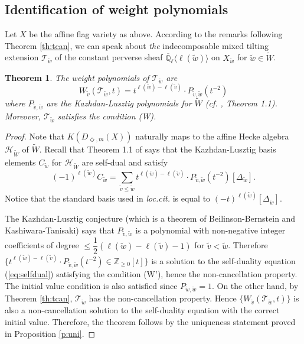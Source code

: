 \documentclass{amsart}
\theoremstyle{plain}
\newtheorem{theorem}[subsubsection]{Theorem}
\theoremstyle{definition}
\theoremstyle{remark}
\numberwithin{equation}{subsection}
\begin{document}
\subsection{Identification of weight polynomials}
Let $X$ be the affine flag variety as above. According to the remarks following Theorem \ref{th:tcan}, we can speak about {\em the} indecomposable mixed tilting extension ${\mathcal{T}}_{\widetilde{w}}$ of the constant perverse sheaf ${\overline{\mathbb{Q}}_{\ell}}{\langle{{\ell({\widetilde{w}})}}\rangle}$ on $X_{\widetilde{w}}$ for ${\widetilde{w}}\in{\widetilde{W}}$.  
\begin{theorem}\label{th:KL}
The weight polynomials of ${\mathcal{T}}_{\widetilde{w}}$ are
\begin{equation}\label{eq:tiltKL}
W_{\widetilde{v}}({\mathcal{T}}_{\widetilde{w}},t)=t^{\ell({\widetilde{w}})-\ell({\widetilde{v}})}\cdot P_{{\widetilde{v}},{\widetilde{w}}}(t^{-2})
\end{equation}
where $P_{{\widetilde{v}},{\widetilde{w}}}$ are the Kazhdan-Lusztig polynomials for ${\widetilde{W}}$ (cf. \cite{KL}, Theorem 1.1). Moreover, ${\mathcal{T}}_{\widetilde{w}}$ satisfies the condition \textup{(W)}.
\end{theorem}
\begin{proof}
Note that $K({D_{\Diamond,m}({X})})$ naturally maps to the affine Hecke algebra ${\mathcal{H}}_{\widetilde{W}}$ of ${\widetilde{W}}$. Recall that Theorem 1.1 of \cite{KL} says that the Kazhdan-Lusztig basis elements $C_{\widetilde{w}}$ for ${\mathcal{H}}_{\widetilde{W}}$ are self-dual and satisfy
\begin{equation*}
(-1)^{\ell({\widetilde{w}})}C_{\widetilde{w}}=\sum_{{\widetilde{v}}\leq{\widetilde{w}}}t^{\ell({\widetilde{w}})-\ell({\widetilde{v}})}\cdot P_{{\widetilde{v}},{\widetilde{w}}}(t^{-2})[\Delta_{\widetilde{w}}].
\end{equation*}
Notice that the standard basis used in \textit{loc.cit.} is equal to $(-t)^{\ell({\widetilde{w}})}[\Delta_{\widetilde{w}}]$.

The Kazhdan-Lusztig conjecture (which is a theorem of Beilinson-Bernstein and Kashiwara-Tanisaki) says that $P_{{\widetilde{v}},{\widetilde{w}}}$ is a polynomial with non-negative integer coefficients of degree $\leq\dfrac{1}{2}(\ell({\widetilde{w}})-\ell({\widetilde{v}})-1)$ for ${\widetilde{v}}<{\widetilde{w}}$. Therefore $\{t^{\ell({\widetilde{w}})-\ell({\widetilde{v}})}\cdot P_{{\widetilde{v}},{\widetilde{w}}}(t^{-2})\in{\mathbb{Z}}_{\geq0}[t]\}$ is a solution to the self-duality equation (\ref{eq:selfdual}) satisfying the condition (W'), hence the non-cancellation property. The initial value condition is also satisfied since $P_{{\widetilde{w}},{\widetilde{w}}}=1$. On the other hand, by Theorem \ref{th:tcan}, ${\mathcal{T}}_{\widetilde{w}}$ has the non-cancellation property. Hence $\{W_{\widetilde{v}}({\mathcal{T}}_{\widetilde{w}},t)\}$ is also a non-cancellation solution to the self-duality equation with the correct initial value. Therefore, the theorem follows by the uniqueness statement proved in Proposition \ref{p:uni}.
\end{proof}
\end{document}
